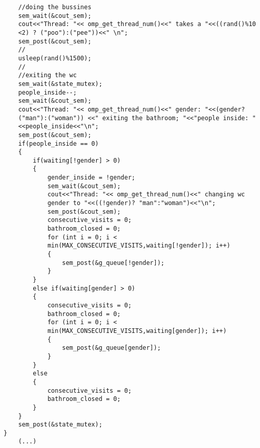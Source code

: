 \documentclass[a4paper,11pt]{article}
\begin{document}
\begin{verbatim}
    //doing the bussines
    sem_wait(&cout_sem);
    cout<<"Thread: "<< omp_get_thread_num()<<" takes a "<<((rand()%10
    <2) ? ("poo"):("pee"))<<" \n";
    sem_post(&cout_sem);
    //
    usleep(rand()%1500);
    //
    //exiting the wc
    sem_wait(&state_mutex);
    people_inside--;
    sem_wait(&cout_sem);
    cout<<"Thread: "<< omp_get_thread_num()<<" gender: "<<(gender? 
    ("man"):("woman")) <<" exiting the bathroom; "<<"people inside: "
    <<people_inside<<"\n";
    sem_post(&cout_sem);    
    if(people_inside == 0)
    {
        if(waiting[!gender] > 0)
        {
            gender_inside = !gender;
            sem_wait(&cout_sem);  
            cout<<"Thread: "<< omp_get_thread_num()<<" changing wc 
            gender to "<<((!gender)? "man":"woman")<<"\n";
            sem_post(&cout_sem);  
            consecutive_visits = 0;
            bathroom_closed = 0;
            for (int i = 0; i < 
            min(MAX_CONSECUTIVE_VISITS,waiting[!gender]); i++)
            {
                sem_post(&g_queue[!gender]);
            }
        }
        else if(waiting[gender] > 0)
        {
            consecutive_visits = 0;
            bathroom_closed = 0;
            for (int i = 0; i < 
            min(MAX_CONSECUTIVE_VISITS,waiting[gender]); i++)
            {
                sem_post(&g_queue[gender]);
            }
        }
        else
        {
            consecutive_visits = 0;
            bathroom_closed = 0;
        }
    }
    sem_post(&state_mutex);
}
    (...)
\end{verbatim}
\end{document}
